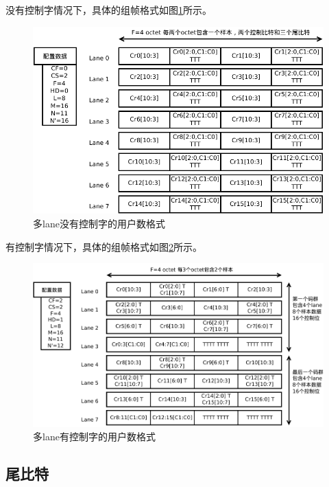 \documentclass[UTF8]{ctexart}
\begin{document}
没有控制字情况下，具体的组帧格式如图\ref{fig:multilane_user_data_format_without_control_word}所示。

\begin{figure}[H]
	\centering
	\includegraphics[width=16cm]{./img/multilane_user_data_format_without_control_word.pdf}
	\caption{多lane没有控制字的用户数格式}
	\label{fig:multilane_user_data_format_without_control_word}
\end{figure}

有控制字情况下，具体的组帧格式如图\ref{fig:multilane_user_data_format_with_two_control_words}所示。

\begin{figure}[H]
	\centering
	\includegraphics[width=16cm]{./img/multilane_user_data_format_with_two_control_words.pdf}
	\caption{多lane有控制字的用户数格式}
	\label{fig:multilane_user_data_format_with_two_control_words}
\end{figure}

\subsection{尾比特}
\end{document}
